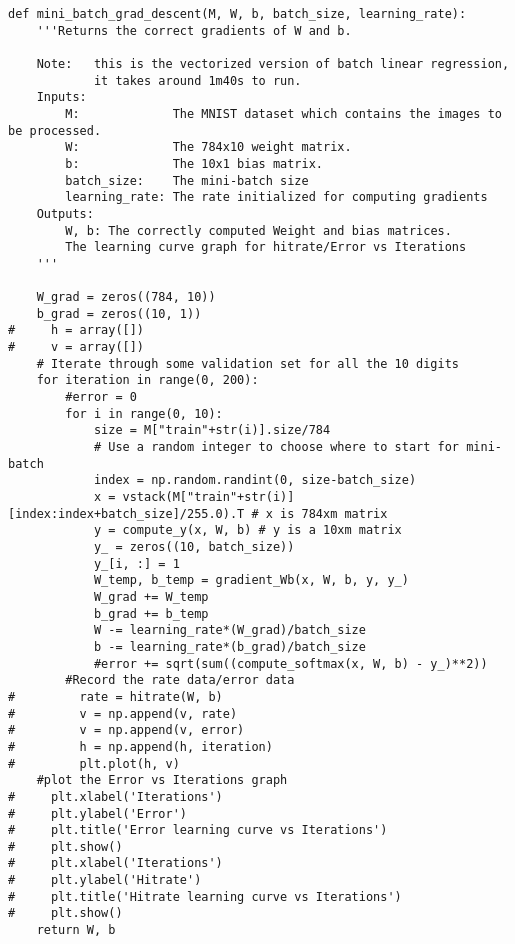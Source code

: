 \documentclass{article}
\begin{document}
\begin{lstlisting}
def mini_batch_grad_descent(M, W, b, batch_size, learning_rate):
    '''Returns the correct gradients of W and b.
    
    Note:   this is the vectorized version of batch linear regression, 
            it takes around 1m40s to run.
    Inputs:
        M:             The MNIST dataset which contains the images to be processed.
        W:             The 784x10 weight matrix.
        b:             The 10x1 bias matrix.
        batch_size:    The mini-batch size
        learning_rate: The rate initialized for computing gradients
    Outputs:
        W, b: The correctly computed Weight and bias matrices.
        The learning curve graph for hitrate/Error vs Iterations
    '''

    W_grad = zeros((784, 10))
    b_grad = zeros((10, 1))
#     h = array([])
#     v = array([])
    # Iterate through some validation set for all the 10 digits
    for iteration in range(0, 200):
        #error = 0
        for i in range(0, 10):
            size = M["train"+str(i)].size/784
            # Use a random integer to choose where to start for mini-batch
            index = np.random.randint(0, size-batch_size)
            x = vstack(M["train"+str(i)][index:index+batch_size]/255.0).T # x is 784xm matrix
            y = compute_y(x, W, b) # y is a 10xm matrix
            y_ = zeros((10, batch_size))
            y_[i, :] = 1
            W_temp, b_temp = gradient_Wb(x, W, b, y, y_)
            W_grad += W_temp
            b_grad += b_temp
            W -= learning_rate*(W_grad)/batch_size
            b -= learning_rate*(b_grad)/batch_size
            #error += sqrt(sum((compute_softmax(x, W, b) - y_)**2))
        #Record the rate data/error data
#         rate = hitrate(W, b)
#         v = np.append(v, rate)
#         v = np.append(v, error)
#         h = np.append(h, iteration)
#         plt.plot(h, v)
    #plot the Error vs Iterations graph
#     plt.xlabel('Iterations')
#     plt.ylabel('Error')
#     plt.title('Error learning curve vs Iterations')
#     plt.show()
#     plt.xlabel('Iterations')
#     plt.ylabel('Hitrate')
#     plt.title('Hitrate learning curve vs Iterations')
#     plt.show()
    return W, b


\end{lstlisting}
\end{document}
